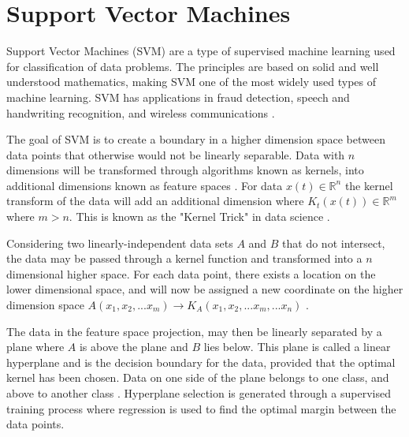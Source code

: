     \section{Support Vector Machines}
        Support Vector Machines (SVM) are a type of supervised machine learning used for classification of data problems. The principles are based on solid and well understood mathematics, making SVM one of the most widely used types of machine learning. SVM has applications in fraud detection, speech and handwriting recognition, and wireless communications \cite{camastra_machine_2008}\cite{zaki_enhanced_2022}.

        The goal of SVM is to create a boundary in a higher dimension space between data points that otherwise would not be linearly separable. Data with $n$ dimensions will be transformed through algorithms known as kernels, into additional dimensions known as feature spaces \cite{noble_what_2006}. For data  $x(t) \in \mathbb{R}^n$ the kernel transform of the data will add an additional dimension where $K_t(x(t)) \in \mathbb{R}^m$ where $m>n$. This is known as the "Kernel Trick" in data science \cite{aizerman_theoretical_1964}.

        Considering two linearly-independent data sets $A$ and $B$ that do not intersect, the data may be passed through a kernel function and transformed into a $n$ dimensional higher space. For each data point, there exists a location on the lower dimensional space, and will now be assigned a new coordinate on the higher dimension space $A(x_1, x_2, ... x_m) \rightarrow K_A(x_1, x_2, ... x_m,... x_n)$ \cite{aizerman_theoretical_1964}.  


        The data in the feature space projection, may then be linearly separated by a plane where $A$ is above the plane and $B$ lies below. This plane is called a linear hyperplane and is the decision boundary for the data, provided that the optimal kernel has been chosen. Data on one side of the plane belongs to one class, and above to another class \cite{phillips_support_1998}. Hyperplane selection is generated through a supervised training process where regression is used to find the optimal margin between the data points.

